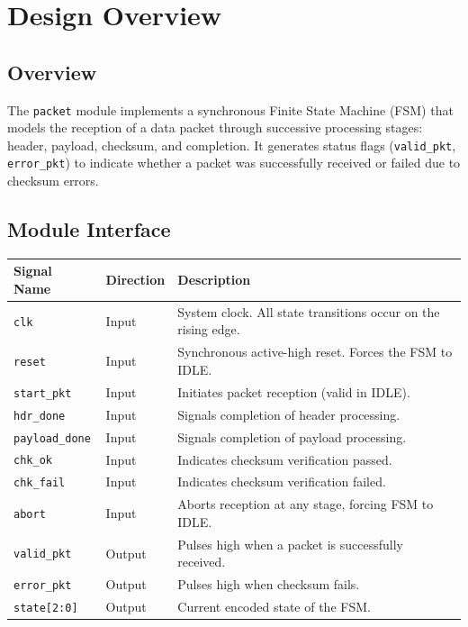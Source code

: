 \chapter{Design Overview} 
\label{cha:design_overview}


\section{Overview}
The \texttt{packet} module implements a synchronous Finite State Machine (FSM) that models the reception of a data packet through successive processing stages: header, payload, checksum, and completion. It generates status flags (\texttt{valid\_pkt}, \texttt{error\_pkt}) to indicate whether a packet was successfully received or failed due to checksum errors.

\section{Module Interface}

\begin{table}[H]
    \centering
    \begin{tabularx}{\textwidth}{@{} l l X @{}}
        \toprule
        \textbf{Signal Name} & \textbf{Direction} & \textbf{Description} \\
        \midrule
        \texttt{clk}            & Input     & System clock. All state transitions occur on the rising edge. \\
        \texttt{reset}          & Input     & Synchronous active-high reset. Forces the FSM to IDLE.        \\
        \texttt{start\_pkt}     & Input     & Initiates packet reception (valid in IDLE).                   \\
        \texttt{hdr\_done}      & Input     & Signals completion of header processing.                      \\
        \texttt{payload\_done}  & Input     & Signals completion of payload processing.                     \\
        \texttt{chk\_ok}        & Input     & Indicates checksum verification passed.                       \\
        \texttt{chk\_fail}      & Input     & Indicates checksum verification failed.                       \\
        \texttt{abort}          & Input     & Aborts reception at any stage, forcing FSM to IDLE.           \\
        \texttt{valid\_pkt}     & Output    & Pulses high when a packet is successfully received.           \\
        \texttt{error\_pkt}     & Output    & Pulses high when checksum fails.                              \\
        \texttt{state[2:0]}     & Output    & Current encoded state of the FSM.                             \\
        \bottomrule
    \end{tabularx}
\end{table}


